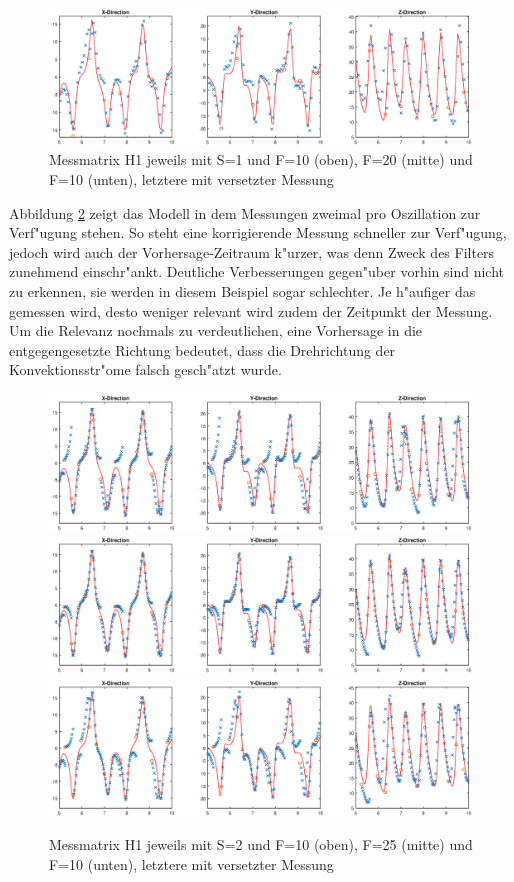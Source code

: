 \begin{refsection}
\begin{figure}
\includegraphics[width=\hsize]{kalman/figures/H1R10S1aS.eps}
\caption{Messmatrix H1 jeweils mit S=1 und F=10 (oben), F=20 (mitte) und F=10 (unten), letztere mit versetzter Messung}
\label{skript:H1S1}
\end{figure}

Abbildung \ref{skript:H1S2} zeigt das Modell in dem Messungen zweimal pro Oszillation zur Verf"ugung stehen. So steht eine korrigierende Messung schneller zur Verf"ugung, jedoch wird auch der Vorhersage-Zeitraum k"urzer, was denn Zweck des Filters zunehmend einschr"ankt. Deutliche Verbesserungen gegen"uber vorhin sind nicht zu erkennen, sie werden in diesem Beispiel sogar schlechter. Je h"aufiger das gemessen wird, desto weniger relevant wird zudem der Zeitpunkt der Messung.
Um die Relevanz nochmals zu verdeutlichen, eine Vorhersage in die entgegengesetzte Richtung bedeutet, dass die Drehrichtung  der Konvektionsstr"ome falsch gesch"atzt wurde.
\begin{figure}
\centering
\includegraphics[width=\hsize]{kalman/figures/H1R10S2.eps}
\includegraphics[width=\hsize]{kalman/figures/H1R25S2.eps}
\includegraphics[width=\hsize]{kalman/figures/H1R10S2aS.eps}
\caption{Messmatrix H1 jeweils mit S=2 und F=10 (oben), F=25 (mitte) und F=10 (unten), letztere mit versetzter Messung}
\label{skript:H1S2}
\end{figure}


\end{refsection}
